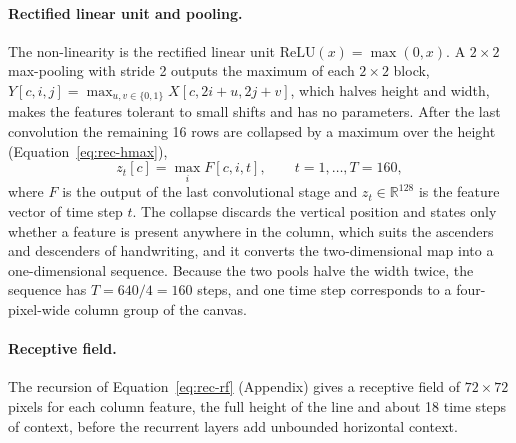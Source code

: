\paragraph{Rectified linear unit and pooling.}
The non-linearity is the rectified linear unit $\mathrm{ReLU}(x)=\max(0,x)$.
A $2\times2$ max-pooling with stride 2 outputs the maximum of each $2\times2$ block, $Y[c,i,j]=\max_{u,v\in\{0,1\}}X[c,2i+u,2j+v]$, which halves height and width, makes the features tolerant to small shifts and has no parameters.
After the last convolution the remaining 16 rows are collapsed by a maximum over the height (Equation~\ref{eq:rec-hmax}),
\begin{equation}
z_t[c]=\max_{i}F[c,i,t],\qquad t=1,\ldots,T=160,
\label{eq:rec-hmax}
\end{equation}
where $F$ is the output of the last convolutional stage and $z_t\in\mathbb R^{128}$ is the feature vector of time step $t$.
The collapse discards the vertical position and states only whether a feature is present anywhere in the column, which suits the ascenders and descenders of handwriting, and it converts the two-dimensional map into a one-dimensional sequence.
Because the two pools halve the width twice, the sequence has $T=640/4=160$ steps, and one time step corresponds to a four-pixel-wide column group of the canvas.

\paragraph{Receptive field.}
The recursion of Equation~\ref{eq:rec-rf} (Appendix) gives a receptive field of $72\times72$ pixels for each column feature, the full height of the line and about 18 time steps of context, before the recurrent layers add unbounded horizontal context.

